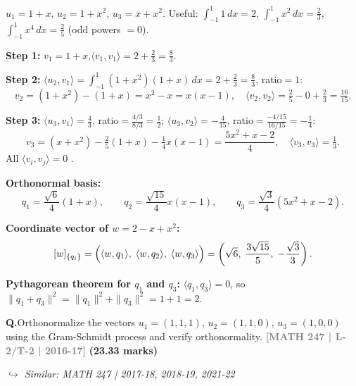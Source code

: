 \documentclass[12pt,a3paper]{article}
\newcommand{\yr}[1]{\hfill\textcolor{gray}{\small\textbf{[#1]}}}
\newcommand{\mk}[1]{\textcolor{orange!70!black}{\small\textbf{(#1 marks)}}}
\newcommand{\variant}[1]{\par\vspace{1pt}\textcolor{blue!50!black}%
  {\footnotesize\textit{$\hookrightarrow$ Similar: #1}}}
\newcounter{qnum}
\newcommand{\Q}[1]{%
  \needspace{4\baselineskip}
  \refstepcounter{qnum}
  \vspace{6pt}
  \noindent\textbf{Q\theqnum.}\enspace #1\par
}
\begin{document}
\begin{tcolorbox}[enhanced,breakable,
  colback=cD!4,colframe=cD,boxrule=0.8pt,arc=5pt,
  title={\textbf{Answer --- Gram-Schmidt on $P_2$, Inner Product $\langle u,v\rangle=\int_{-1}^{1}uv\,dx$}},
  fonttitle=\bfseries\color{white},colbacktitle=cD]

$u_1=1+x$, $u_2=1+x^2$, $u_3=x+x^2$.\quad
Useful: $\int_{-1}^1 1\,dx=2$, $\int_{-1}^1 x^2\,dx=\tfrac{2}{3}$, $\int_{-1}^1 x^4\,dx=\tfrac{2}{5}$ (odd powers $=0$).

\textbf{Step 1:} $v_1=1+x$,\quad $\langle v_1,v_1\rangle=2+\tfrac{2}{3}=\tfrac{8}{3}$.

\textbf{Step 2:}
$\langle u_2,v_1\rangle=\int_{-1}^1(1+x^2)(1+x)\,dx=2+\tfrac{2}{3}=\tfrac{8}{3}$,\; ratio$=1$:
\[
v_2=(1+x^2)-(1+x)=x^2-x=x(x-1),\quad
\langle v_2,v_2\rangle=\tfrac{2}{5}-0+\tfrac{2}{3}=\tfrac{16}{15}.
\]

\textbf{Step 3:}
$\langle u_3,v_1\rangle=\tfrac{4}{3}$,\; ratio$=\tfrac{4/3}{8/3}=\tfrac{1}{2}$;\quad
$\langle u_3,v_2\rangle=-\tfrac{4}{15}$,\; ratio$=\tfrac{-4/15}{16/15}=-\tfrac{1}{4}$:
\[
v_3=(x+x^2)-\tfrac{2}{5}(1+x)-\tfrac{1}{4}x(x-1)
=\frac{5x^2+x-2}{4},\quad
\langle v_3,v_3\rangle=\tfrac{1}{3}.
\]
All $\langle v_i,v_j\rangle=0$ . \checkmark

\textbf{Orthonormal basis:}
\[
q_1=\frac{\sqrt{6}}{4}(1+x),\qquad
q_2=\frac{\sqrt{15}}{4}x(x-1),\qquad
q_3=\frac{\sqrt{3}}{4}(5x^2+x-2).
\]

\textbf{Coordinate vector of $w=2-x+x^2$:}
\[
[w]_{\{q_i\}}=\Bigl(\langle w,q_1\rangle,\;\langle w,q_2\rangle,\;\langle w,q_3\rangle\Bigr)
=\left(\sqrt{6},\;\frac{3\sqrt{15}}{5},\;-\frac{\sqrt{3}}{3}\right).
\]

\textbf{Pythagorean theorem for $q_1$ and $q_3$:}
$\langle q_1,q_3\rangle=0$, so
$\|q_1+q_3\|^2=\|q_1\|^2+\|q_3\|^2=1+1=2$. \checkmark

\end{tcolorbox}


\Q{Orthonormalize the vectors $u_1 = (1,1,1)$, $u_2 = (1,1,0)$, $u_3 = (1,0,0)$ using the Gram-Schmidt process and verify orthonormality.
\yr{MATH 247 | L-2/T-2 | 2016-17} \mk{23.33}
\variant{MATH 247 | 2017-18, 2018-19, 2021-22}}
\end{document}
